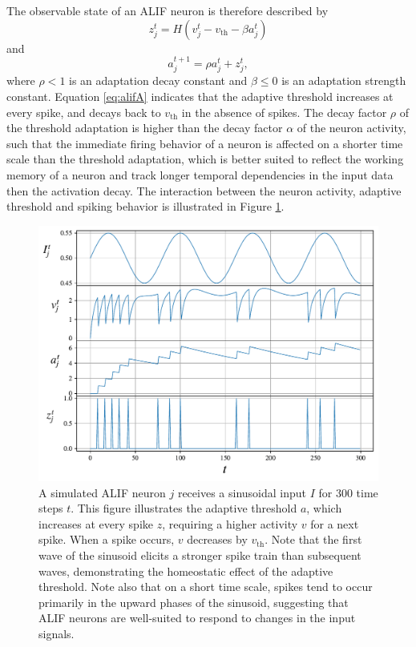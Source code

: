             The observable state of an ALIF neuron is therefore described by
            \begin{equation}\label{eq:alifZ}
            z^t_j = H\left(v_j^t - v_\text{th} - \beta a^t_j\right)
            \end{equation}
            and
            \begin{equation}\label{eq:alifA}
            a^{t+1}_j = \rho a^t_j + z^t_j,
            \end{equation}
            where $\rho < 1$ is an adaptation decay constant and $\beta \leq 0$ is an adaptation strength constant.
            Equation \ref{eq:alifA} indicates that the adaptive threshold increases at every spike, and decays back to $v_\text{th}$ in the absence of spikes.
            The decay factor $\rho$ of the threshold adaptation is higher than the decay factor $\alpha$ of the neuron activity, such that the immediate firing behavior of a neuron is affected on a shorter time scale than the threshold adaptation, which is better suited to reflect the working memory of a neuron and track longer temporal dependencies in the input data then the activation decay.
            The interaction between the neuron activity, adaptive threshold and spiking behavior is illustrated in Figure \ref{fig:simplealif}.

            \begin{figure}[!ht]
                \centering
                \includegraphics[width=\linewidth]{gfx/simplealif}
                \caption[ALIF neuron simulation.]{A simulated ALIF neuron $j$ receives a sinusoidal input $I$ for 300 time steps $t$. This figure illustrates the adaptive threshold $a$, which increases at every spike $z$, requiring a higher activity $v$ for a next spike. When a spike occurs, $v$ decreases by $v_\text{th}$. Note that the first wave of the sinusoid elicits a stronger spike train than subsequent waves, demonstrating the homeostatic effect of the adaptive threshold. Note also that on a short time scale, spikes tend to occur primarily in the upward phases of the sinusoid, suggesting that ALIF neurons are well-suited to respond to changes in the input signals.}
                \label{fig:simplealif}
            \end{figure}


